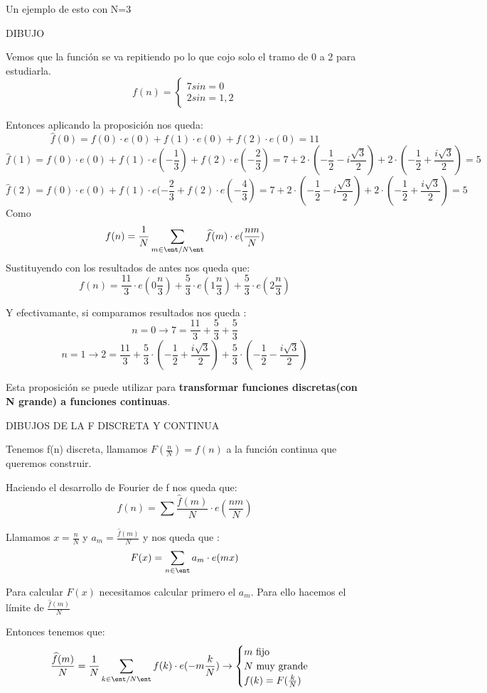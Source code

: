 \begin{example}
	Un ejemplo de esto con N=3
	
	DIBUJO
	
	Vemos que la función se va repitiendo po lo que cojo solo el tramo de 0 a 2 para estudiarla.
	$$f(n) = \begin{cases}
	7 si n= 0\\
	2 si n = 1 , 2
	\end{cases}$$
	
	Entonces aplicando la proposición nos queda:
	$$\widehat{f}(0) = f(0)\cdot e(0) + f(1)\cdot e(0) + f(2) \cdot e(0) =  11$$
	$$\widehat{f}(1) = f(0)\cdot e(0) + f(1)\cdot e(-\frac{1}{3}) + f(2)\cdot e(-\frac{2}{3}) = 7 + 2\cdot(-\frac{1}{2} -i\frac{\sqrt{3}}{2}) + 2\cdot (-\frac{1}{2} + \frac{i\sqrt{3}}{2}) = 5$$
	$$\widehat{f}(2) = f(0)\cdot e(0) + f(1)\cdot e(- \frac{2}{3} + f(2)\cdot e(-\frac{4}{3}) = 7 + 2\cdot(-\frac{1}{2} -i\frac{\sqrt{3}}{2}) + 2\cdot (-\frac{1}{2} + \frac{i\sqrt{3}}{2}) = 5$$
	Como 
	$$f(n) = \frac{1}{N} \sum_{m\in \ent/ N\ent} \widehat{f}(m) \cdot e(\frac{nm}{N})$$
	Sustituyendo con los resultados de antes nos queda que:
	$$f(n) = \frac{11}{3}\cdot e(0 \frac{n}{3}) + \frac{5}{3}\cdot e(1 \frac{n}{3}) + \frac{5}{3} \cdot e(2 \frac{n}{3})$$
	
	Y efectivamante, si comparamos resultados nos queda :
	$$n = 0 \rightarrow 7 = \frac{11}{3} + \frac{5}{3} + \frac{5}{3}$$
	$$n = 1 \rightarrow 2 = \frac{11}{3} + \frac{5}{3} \cdot (- \frac{1}{2} + \frac{i \sqrt{3}}{2}) + \frac{5}{3} \cdot (- \frac{1}{2} -\frac{i \sqrt{3}}{2})$$
\end{example}

Esta proposición se puede utilizar para \textbf{transformar funciones discretas(con N grande) a funciones continuas}.

DIBUJOS DE LA F DISCRETA Y CONTINUA

Tenemos f(n) discreta, llamamos $F(\frac{n}{N}) = f(n)$ a la función continua que queremos construir.


Haciendo el desarrollo de Fourier de f nos queda que:
$$f(n) = \sum \frac{\widehat{f}(m)}{N} \cdot e(\frac{nm}{N})$$

Llamamos $x = \frac{n}{N}$ y $a_m= \frac{\widehat{f}(m)}{N}$ y nos queda que :
$$F(x) = \sum_{n\in \ent } a_m \cdot e(mx)$$

Para calcular $F(x)$ necesitamos calcular primero el $a_m$. Para ello hacemos el límite de $\frac{\widehat{f}(m)}{N}$

Entonces tenemos que:
$$\frac{\widehat{f}(m)}{N} = \frac{1}{N} \sum_{k \in \ent/N\ent} f(k) \cdot e(-m \frac{k}{N}) \rightarrow \begin{cases}
	m \text{ fijo}\\
	N \text{ muy grande}\\
	f(k) = F(\frac{k}{N})\\
\end{cases}$$

